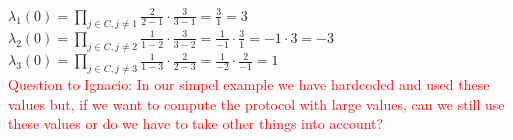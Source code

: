 \noindent
\begin{infobox}
\begin{math}\lambda_1(0)=\prod\limits_{j\in C,j\neq 1} \frac{2}{2-1}  \cdot  \frac{3}{3-1} =\frac{3}{1} = 3 \end{math}\\
\begin{math}\lambda_2(0)=\prod\limits_{j\in C,j\neq 2} \frac{1}{1-2}  \cdot  \frac{3}{3-2} =\frac{1}{-1} \cdot  \frac{3}{1} =-1 \cdot  3=-3 \end{math}\\
\begin{math}\lambda_3(0)=\prod\limits_{j\in C,j\neq 3} \frac{1}{1-3}  \cdot  \frac{2}{2-3} =\frac{1}{-2} \cdot  \frac{2}{-1} =1 \end{math}\\
\textcolor{red}{Question to Ignacio: In our simpel example we have hardcoded and used these values but, if we want to compute the protocol with large values, can we still use these values or do we have to take other things into account?}
\label{info:Computing_the_coefficients}
\end{infobox}
